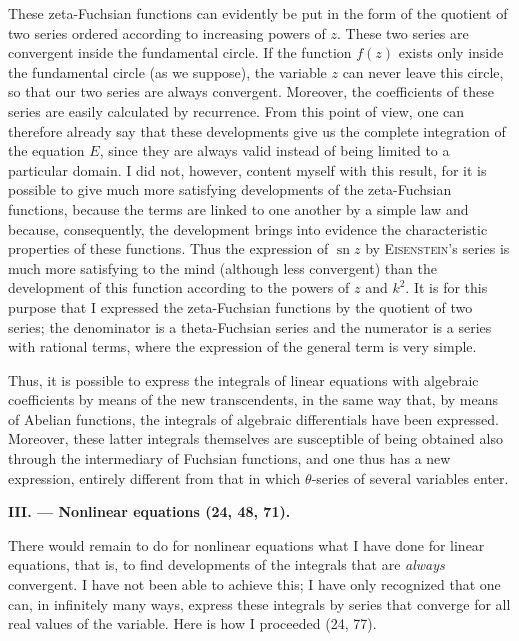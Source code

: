 \documentclass[11pt]{article}
\begin{document}
These zeta-Fuchsian functions can evidently be put in the form of the quotient of two series ordered according to increasing powers of $z$. These two series are convergent inside the fundamental circle. If the function $f(z)$ exists only inside the fundamental circle (as we suppose), the variable $z$ can never leave this circle, so that our two series are always convergent. Moreover, the coefficients of these series are easily calculated by recurrence. From this point of view, one can therefore already say that these developments give us the complete integration of the equation $E$, since they are always valid instead of being limited to a particular domain. I did not, however, content myself with this result, for it is possible to give much more satisfying developments of the zeta-Fuchsian functions, because the terms are linked to one another by a simple law and because, consequently, the development brings into evidence the characteristic properties of these functions. Thus the expression of $\operatorname{sn} z$ by \textsc{Eisenstein}’s series is much more satisfying to the mind (although less convergent) than the development of this function according to the powers of $z$ and $k^2$. It is for this purpose that I expressed the zeta-Fuchsian functions by the quotient of two series; the denominator is a theta-Fuchsian series and the numerator is a series with rational terms, where the expression of the general term is very simple.

Thus, it is possible to express the integrals of linear equations with algebraic coefficients by means of the new transcendents, in the same way that, by means of Abelian functions, the integrals of algebraic differentials have been expressed. Moreover, these latter integrals themselves are susceptible of being obtained also through the intermediary of Fuchsian functions, and one thus has a new expression, entirely different from that in which $\theta$-series of several variables enter.

\renewcommand{\thefootnote}{(\arabic{footnote})}
\setcounter{footnote}{0}

\begin{center}
\textbf{III. — Nonlinear equations (24, 48, 71).}
\end{center}

There would remain to do for nonlinear equations what I have done for linear equations, that is, to find developments of the integrals that are \emph{always} convergent. I have not been able to achieve this; I have only recognized that one can, in infinitely many ways, express these integrals by series that converge for all real values of the variable. Here is how I proceeded (24, 77).
\end{document}
